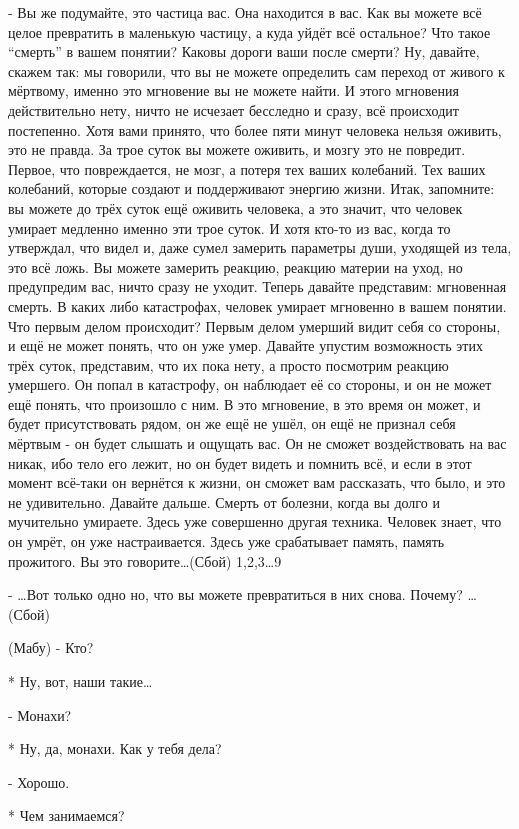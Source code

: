 -  Вы же подумайте, это частица вас. Она находится в вас. Как вы можете всё целое превратить в маленькую частицу, а куда уйдёт всё остальное? Что такое “смерть” в вашем понятии? Каковы дороги ваши после смерти? Ну, давайте, скажем так: мы говорили, что вы не можете определить сам переход от живого к мёртвому, именно это мгновение вы не можете найти. И этого мгновения действительно нету, ничто не исчезает бесследно и сразу, всё происходит постепенно. Хотя вами принято, что более пяти минут человека нельзя оживить, это не правда. За трое суток вы можете оживить, и мозгу это не повредит. Первое, что повреждается, не мозг, а потеря тех ваших колебаний. Тех ваших колебаний, которые создают и поддерживают  энергию жизни. Итак, запомните: вы можете до трёх суток ещё оживить человека, а это значит, что человек умирает медленно именно эти трое суток. И хотя кто-то из вас, когда то утверждал, что видел и, даже сумел замерить параметры души, уходящей из тела, это всё ложь. Вы можете замерить реакцию, реакцию материи на уход, но предупредим вас, ничто сразу не уходит. Теперь давайте представим: мгновенная смерть. В каких либо катастрофах, человек умирает мгновенно в вашем понятии. Что первым делом происходит? Первым делом умерший видит себя со стороны, и ещё не может понять, что он уже умер. Давайте упустим возможность этих трёх суток, представим, что их пока нету, а просто посмотрим реакцию умершего. Он попал в катастрофу, он наблюдает её со стороны, и он не может ещё понять, что произошло с ним. В это мгновение, в это время он может, и будет присутствовать рядом, он же ещё не ушёл, он ещё не признал себя мёртвым - он будет слышать и ощущать вас. Он не сможет воздействовать на вас никак, ибо тело его лежит, но он будет видеть и помнить всё, и если в этот момент  всё-таки он вернётся к жизни, он сможет вам рассказать, что было, и это не удивительно. Давайте дальше. Смерть от болезни, когда вы долго и мучительно умираете. Здесь уже совершенно другая техника. Человек знает, что он умрёт, он уже настраивается. Здесь уже срабатывает память, память прожитого. Вы это говорите…(Сбой)
1,2,3…9

- …Вот только одно но, что вы можете превратиться в них снова. Почему? … (Сбой)

(Мабу)
- Кто?

* Ну, вот, наши такие…

- Монахи?

* Ну, да, монахи. Как у тебя дела?

- Хорошо.

* Чем занимаемся?

